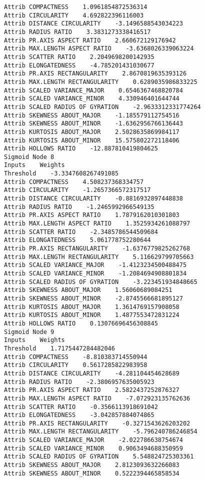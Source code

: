 \documentclass[
	article,			%
	11pt,				%
	oneside,			%
	a4paper,			%
	english,			%
	brazil,				%
	sumario=tradicional
	]{abntex2}
\begin{document}
\begin{lstlisting}
Attrib COMPACTNESS    1.0961854872536314
Attrib CIRCULARITY    4.692822396116003
Attrib DISTANCE CIRCULARITY    -3.1496588543034223
Attrib RADIUS RATIO    3.3831273338416517
Attrib PR.AXIS ASPECT RATIO    2.660672129176942
Attrib MAX.LENGTH ASPECT RATIO    -3.6368026339063224
Attrib SCATTER RATIO    2.2049698200142935
Attrib ELONGATEDNESS    -4.785201431030677
Attrib PR.AXIS RECTANGULARITY    2.8670819635393126
Attrib MAX.LENGTH RECTANGULARITY    0.6289035986833225
Attrib SCALED VARIANCE_MAJOR    0.6546367468820784
Attrib SCALED VARIANCE_MINOR    4.330946401644744
Attrib SCALED RADIUS OF GYRATION    -2.9633312331774264
Attrib SKEWNESS ABOUT_MAJOR    -1.185579112754516
Attrib SKEWNESS ABOUT_MINOR    -1.6362956766136443
Attrib KURTOSIS ABOUT_MAJOR    2.5028635869984117
Attrib KURTOSIS ABOUT_MINOR    15.575802272118406
Attrib HOLLOWS RATIO    -12.887810419804625
Sigmoid Node 8
Inputs    Weights
Threshold    -3.3347608267491085
Attrib COMPACTNESS    4.508237368334757
Attrib CIRCULARITY    -1.2657366572317517
Attrib DISTANCE CIRCULARITY    -0.8816932897448838
Attrib RADIUS RATIO    -1.2465992966549135
Attrib PR.AXIS ASPECT RATIO    1.7879162010301803
Attrib MAX.LENGTH ASPECT RATIO    1.3525934261088797
Attrib SCATTER RATIO    -2.3485786544509684
Attrib ELONGATEDNESS    5.061778752280644
Attrib PR.AXIS RECTANGULARITY    -1.6376779825262768
Attrib MAX.LENGTH RECTANGULARITY    5.116629799705663
Attrib SCALED VARIANCE_MAJOR    -1.4123234500488475
Attrib SCALED VARIANCE_MINOR    -1.2084694908801834
Attrib SCALED RADIUS OF GYRATION    -3.223451934848665
Attrib SKEWNESS ABOUT_MAJOR    1.56060689084251
Attrib SKEWNESS ABOUT_MINOR    -2.8745566681895127
Attrib KURTOSIS ABOUT_MAJOR    1.3614769157908058
Attrib KURTOSIS ABOUT_MINOR    1.4877553472831224
Attrib HOLLOWS RATIO    0.13076696456308845
Sigmoid Node 9
Inputs    Weights
Threshold    1.7175447284482046
Attrib COMPACTNESS    -8.810383714550944
Attrib CIRCULARITY    0.5617285822983958
Attrib DISTANCE CIRCULARITY    -4.281104454628689
Attrib RADIUS RATIO    -2.3806957635005923
Attrib PR.AXIS ASPECT RATIO    2.5822437252876327
Attrib MAX.LENGTH ASPECT RATIO    -7.072923135762636
Attrib SCATTER RATIO    -0.3566113918691042
Attrib ELONGATEDNESS    -3.042857884074865
Attrib PR.AXIS RECTANGULARITY    -0.3271543626203202
Attrib MAX.LENGTH RECTANGULARITY    -5.796240786246854
Attrib SCALED VARIANCE_MAJOR    -2.022786638754674
Attrib SCALED VARIANCE_MINOR    0.9063494688350959
Attrib SCALED RADIUS OF GYRATION    5.548824725303361
Attrib SKEWNESS ABOUT_MAJOR    2.8123093632266083
Attrib SKEWNESS ABOUT_MINOR    0.5222394465858534

\end{lstlisting}
\end{document}
